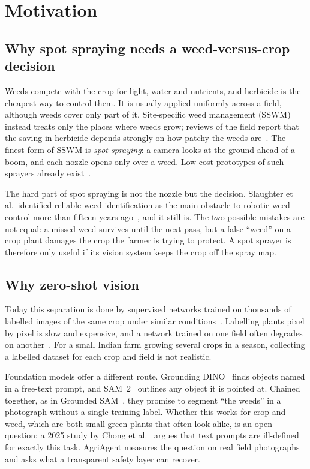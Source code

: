 \chapter{Motivation}\label{ch:motivation}

\section{Why spot spraying needs a weed-versus-crop decision}
Weeds compete with the crop for light, water and nutrients, and herbicide is the cheapest way to
control them. It is usually applied uniformly across a field, although weeds cover only part of it.
Site-specific weed management (SSWM) instead treats only the places where weeds grow; reviews of the
field report that the saving in herbicide depends strongly on how patchy the weeds
are~\cite{gerhards2022sswm}. The finest form of SSWM is \emph{spot spraying}: a camera looks at the
ground ahead of a boom, and each nozzle opens only over a weed. Low-cost prototypes of such sprayers
already exist~\cite{partel2019sprayer}.

The hard part of spot spraying is not the nozzle but the decision. Slaughter et al.\ identified
reliable weed identification as the main obstacle to robotic weed control more than fifteen years
ago~\cite{slaughter2008review}, and it still is. The two possible mistakes are not equal: a missed
weed survives until the next pass, but a false ``weed'' on a crop plant damages the crop the farmer is
trying to protect. A spot sprayer is therefore only useful if its vision system keeps the crop off
the spray map.

\section{Why zero-shot vision}
Today this separation is done by supervised networks trained on thousands of labelled images of the
same crop under similar conditions~\cite{milioto2018realtime,lottes2018fcn,hasan2021survey}. Labelling
plants pixel by pixel is slow and expensive, and a network trained on one field often degrades on
another~\cite{weyler2023domain}. For a small Indian farm growing several crops in a season, collecting
a labelled dataset for each crop and field is not realistic.

Foundation models offer a different route. Grounding DINO~\cite{liu2024groundingdino} finds objects
named in a free-text prompt, and SAM~2~\cite{ravi2025sam2} outlines any object it is pointed at.
Chained together, as in Grounded SAM~\cite{ren2024groundedsam}, they promise to segment ``the weeds''
in a photograph without a single training label. Whether this works for crop and weed, which are both
small green plants that often look alike, is an open question: a 2025 study by Chong et
al.~\cite{chong2025zeroshot} argues that text prompts are ill-defined for exactly this task. AgriAgent
measures the question on real field photographs and asks what a transparent safety layer can recover.

